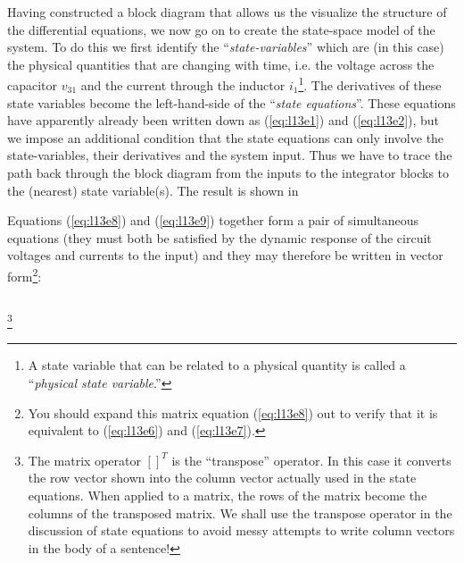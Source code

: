 Having constructed a block diagram that allows us the visualize
the structure of the differential equations, we now go on to
create the state-space model of the system. To do this we first
identify the ``\emph{state-variables}'' which are (in this case)
the physical quantities that are changing with time, i.e. the
voltage across the capacitor $v_{31}$ and the current through the
inductor $i_1$\footnote{A state variable that can be related to a
physical quantity is called a ``\emph{physical state
variable}.''}. The derivatives of these state variables become the
left-hand-side of the ``\emph{state equations}''. These equations
have apparently already been written down as (\ref{eq:l13e1}) and
(\ref{eq:l13e2}), but we impose an additional condition that the
state equations can only involve the state-variables, their
derivatives and the system input. Thus we have to trace the path
back through the block diagram from the inputs to the integrator
blocks to the (nearest) state variable(s). The result is
\ifslidesonly
shown in 
\begin{slide}\label{slide:ss1}

\end{slide}
\fi

Equations (\ref{eq:l13e8}) and (\ref{eq:l13e9}) together form a pair
of simultaneous equations (they must both be satisfied by the
dynamic response of the circuit voltages and currents to the
input) and they may therefore be written in vector
form\footnote{You should expand this matrix equation
(\ref{eq:l13e8}) out to verify that it is equivalent to
(\ref{eq:l13e6}) and (\ref{eq:l13e7}).}:
\begin{equation}\label{eq:l13e10}

\end{equation}
\ifslidesonly
\begin{slide}
\begin{displaymath}

\end{displaymath}

\end{slide}
\fi
\footnote{The matrix
operator $[]^T$ is the ``transpose'' operator. In this case it
converts the row vector shown into the column vector actually used
in the state equations. When applied to a matrix, the rows of the
matrix become the columns of the transposed matrix. We shall use
the transpose operator in the discussion of state equations to
avoid messy attempts to write column vectors in the body of a
sentence!}

